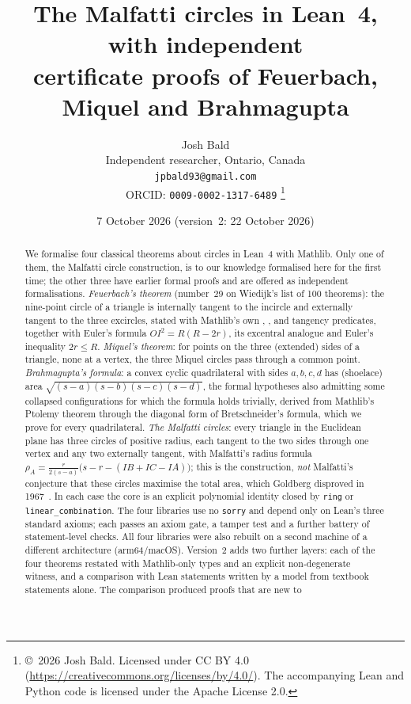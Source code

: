 \documentclass[11pt]{article}
\title{The Malfatti circles in Lean~4, with independent\\
certificate proofs of Feuerbach, Miquel and Brahmagupta}
\author{Josh Bald\\ \small Independent researcher, Ontario, Canada\\ \small\texttt{jpbald93@gmail.com}\\
\small ORCID: \texttt{0009-0002-1317-6489}
\thanks{\copyright~2026 Josh Bald. Licensed under CC BY 4.0 (\url{https://creativecommons.org/licenses/by/4.0/}). The accompanying Lean and Python code is licensed under the Apache License 2.0.}}
\date{7 October 2026 (version~2: 22 October 2026)}
\theoremstyle{definition}
\theoremstyle{remark}
\newcommand{\lean}[1]{\texttt{#1}}
\begin{document}
\sloppy
\maketitle

\begin{abstract}
We formalise four classical theorems about circles in Lean~4 with Mathlib. Only one of them,
the Malfatti circle construction, is to our knowledge formalised here for the first time; the other
three have earlier formal proofs and are offered as independent formalisations. \emph{Feuerbach's
theorem} (number~29 on Wiedijk's list of 100 theorems): the nine-point circle of a triangle is
internally tangent to the incircle and externally tangent to the three excircles, stated with
Mathlib's own , ,
 and tangency predicates, together with Euler's formula
$OI^2=R(R-2r)$, its excentral analogue and Euler's inequality $2r\le R$. \emph{Miquel's theorem}:
for points on the three (extended) sides of a triangle, none at a vertex, the three Miquel circles
pass through a common point. \emph{Brahmagupta's formula}: a convex cyclic quadrilateral with
sides $a,b,c,d$ has (shoelace) area $\sqrt{(s-a)(s-b)(s-c)(s-d)}$, the formal hypotheses also
admitting some collapsed configurations for which the formula holds trivially, derived from Mathlib's Ptolemy theorem
through the diagonal form of Bretschneider's formula, which we prove for every quadrilateral.
\emph{The Malfatti circles}: every triangle in the Euclidean plane has three circles of positive
radius, each tangent to the two sides through one vertex and any two externally tangent, with
Malfatti's radius formula $\rho_A=\frac{r}{2(s-a)}\bigl(s-r-(IB+IC-IA)\bigr)$; this is the
construction, \emph{not} Malfatti's conjecture that these circles maximise the total area, which
Goldberg disproved in 1967~\cite{Goldberg}.
In each case the core is an explicit polynomial identity closed by \lean{ring} or
\lean{linear\_combination}. The four libraries use no \lean{sorry} and depend only on Lean's three
standard axioms; each passes an axiom gate, a tamper test and a further battery of statement-level
checks. All four libraries were also rebuilt on a second machine of a different architecture
(arm64/macOS). Version~2 adds two further layers: each of the four theorems restated with
Mathlib-only types and an explicit non-degenerate witness, and a comparison with Lean statements
written by a model from textbook statements alone. The comparison produced proofs that are new to

\end{abstract}
\end{document}
